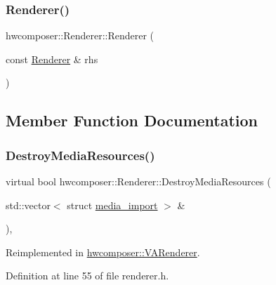 \subsubsection{\texorpdfstring{Renderer()}{Renderer()}\hspace{0.1cm}{\footnotesize\ttfamily [2/2]}}
{\footnotesize\ttfamily hwcomposer\+::\+Renderer\+::\+Renderer (\begin{DoxyParamCaption}\item[{const \mbox{\hyperlink{classhwcomposer_1_1Renderer}{Renderer}} \&}]{rhs }\end{DoxyParamCaption})\hspace{0.3cm}{\ttfamily [delete]}}



\subsection{Member Function Documentation}
\mbox{\label{classhwcomposer_1_1Renderer_a81d8de129d86d71d99366ae59a6fe7f7}} 
\subsubsection{\texorpdfstring{Destroy\+Media\+Resources()}{DestroyMediaResources()}}
{\footnotesize\ttfamily virtual bool hwcomposer\+::\+Renderer\+::\+Destroy\+Media\+Resources (\begin{DoxyParamCaption}\item[{std\+::vector$<$ struct \mbox{\hyperlink{structhwcomposer_1_1media__import}{media\+\_\+import}} $>$ \&}]{ }\end{DoxyParamCaption})\hspace{0.3cm}{\ttfamily [inline]}, {\ttfamily [virtual]}}



Reimplemented in \mbox{\hyperlink{classhwcomposer_1_1VARenderer_a0db23648105f69ce00fea498f28f87ec}{hwcomposer\+::\+V\+A\+Renderer}}.



Definition at line 55 of file renderer.\+h.


\begin{DoxyCode}{0}
\end{DoxyCode}
\mbox{\label{classhwcomposer_1_1Renderer_ab147e6d44d429c0ada5a3212ef7100f1}} 
